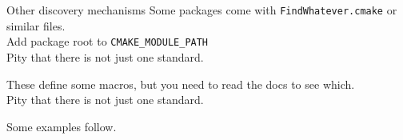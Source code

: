 
\lstset{language=bash}

\begin{numberedframe}{Other discovery mechanisms}
  Some packages come with \texttt{FindWhatever.cmake}
  or similar files.\\
  Add package root to \lstinline{CMAKE_MODULE_PATH}\\
  Pity that there is not just one standard.

  These define some macros, but you need to read the docs
  to see which.\\
  Pity that there is not just one standard.

  Some examples follow.
\end{numberedframe}

